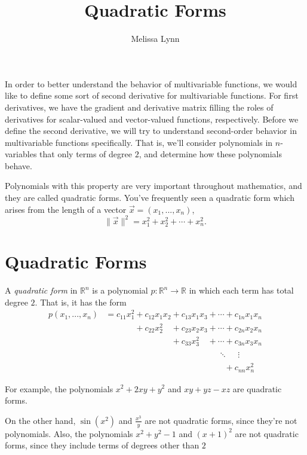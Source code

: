 \documentclass{ximera}
\title{Quadratic Forms}
\author{Melissa Lynn}
\begin{document}
\begin{abstract}
\end{abstract}
\maketitle

In order to better understand the behavior of multivariable functions, we would like to define some sort of second derivative for multivariable functions. For first derivatives, we have the gradient and derivative matrix filling the roles of derivatives for scalar-valued and vector-valued functions, respectively. Before we define the second derivative, we will try to understand second-order behavior in multivariable functions specifically. That is, we'll consider polynomials in $n$-variables that only terms of degree $2$, and determine how these polynomials behave.

Polynomials with this property are very important throughout mathematics, and they are called quadratic forms. You've frequently seen a quadratic form which arises from the length of a vector $\vec{x} = (x_1,...,x_n)$,
\[
\|\vec{x}\|^2 = x_1^2 + x_2^2 + \cdots + x_n^2.
\]

\section*{Quadratic Forms}

\begin{definition}
A \emph{quadratic form} in $\mathbb{R}^n$ is a polynomial $p:\mathbb{R}^n\rightarrow\mathbb{R}$ in which each term has total degree $2$. That is, it has the form
\begin{align*}
p(x_1,...,x_n) &= c_{11}x_1^2+c_{12}x_1x_2+c_{13}x_1x_3 + \cdots + c_{1n}x_1x_n\\
&\phantom{= c_{11}x_1^2}+c_{22}x_2^2\phantom{x_2}+c_{23}x_2x_3 + \cdots + c_{2n}x_2x_n\\
&\phantom{= c_{11}x_1^2+c_{12}x_1x_2}+c_{33}x_3^2\phantom{x_3} + \cdots + c_{3n}x_3x_n\\
&\phantom{= c_{11}x_1^2+c_{12}x_1x_2+c_{13}x_1x_3 +} \ddots \phantom{+} \vdots\\
&\phantom{= c_{11}x_1^2+c_{12}x_1x_2+c_{13}x_1x_3 + \cdots }+ c_{nn}x_n^2
\end{align*}
\end{definition}

\begin{example}
For example, the polynomials $x^2+2xy+y^2$ and $xy+yz-xz$ are quadratic forms.

On the other hand, $\sin(x^2)$ and $\frac{x^3}{y}$ are not quadratic forms, since they're not polynomials. Also, the polynomials $x^2+y^2-1$ and $(x+1)^2$ are not quadratic forms, since they include terms of degrees other than $2$
\end{example}
\end{document}
